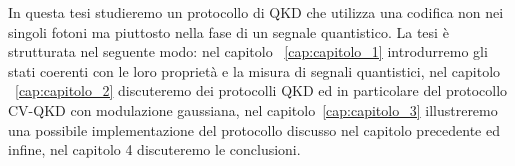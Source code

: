 In questa tesi studieremo un protocollo di QKD che utilizza una codifica non nei singoli fotoni ma piuttosto nella fase di un segnale quantistico. La tesi è strutturata nel seguente modo: nel capitolo ~\ref{cap:capitolo_1} introdurremo gli stati coerenti con le loro propriet\`a e la misura di segnali quantistici, nel capitolo ~\ref{cap:capitolo_2} discuteremo dei protocolli QKD ed in particolare del protocollo CV-QKD con modulazione gaussiana,  nel capitolo~\ref{cap:capitolo_3} illustreremo una possibile implementazione del protocollo discusso nel capitolo precedente ed infine, nel capitolo 4 discuteremo le conclusioni.


























